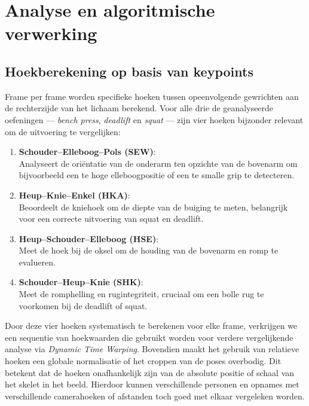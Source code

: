 \chapter{Analyse en algoritmische verwerking}
\label{ch:algoritme}

\section{Hoekberekening op basis van keypoints}
Frame per frame worden specifieke hoeken tussen opeenvolgende gewrichten aan de rechterzijde van het lichaam berekend. 
Voor alle drie de geanalyseerde oefeningen — \textit{bench press}, \textit{deadlift} en \textit{squat} —  zijn vier hoeken bijzonder relevant om
 de uitvoering te vergelijken:

\begin{enumerate}
    \item \textbf{Schouder–Elleboog–Pols (SEW)}: \\
    Analyseert de oriëntatie van de onderarm ten opzichte van de bovenarm om bijvoorbeeld een te hoge elleboogpositie of een te smalle grip te detecteren.
    
    \item \textbf{Heup–Knie–Enkel (HKA)}: \\
    Beoordeelt de kniehoek om de diepte van de buiging te meten, belangrijk voor een correcte uitvoering van squat en deadlift.

    \item \textbf{Heup–Schouder–Elleboog (HSE)}: \\
    Meet de hoek bij de oksel om de houding van de bovenarm en romp te evalueren.

    \item \textbf{Schouder–Heup–Knie (SHK)}: \\
    Meet de romphelling en rugintegriteit, cruciaal om een bolle rug te voorkomen bij de deadlift of squat.
\end{enumerate}

Door deze vier hoeken systematisch te berekenen voor elke frame, verkrijgen we een sequentie van hoekwaarden die gebruikt worden voor verdere vergelijkende analyse via \textit{Dynamic Time Warping}.
Bovendien maakt het gebruik van relatieve hoeken een globale normalisatie of het croppen van de poses overbodig. 
Dit betekent dat de hoeken onafhankelijk zijn van de absolute positie of schaal van het skelet in het beeld. 
Hierdoor kunnen verschillende personen en opnames met verschillende camerahoeken of afstanden toch goed met elkaar vergeleken worden.

